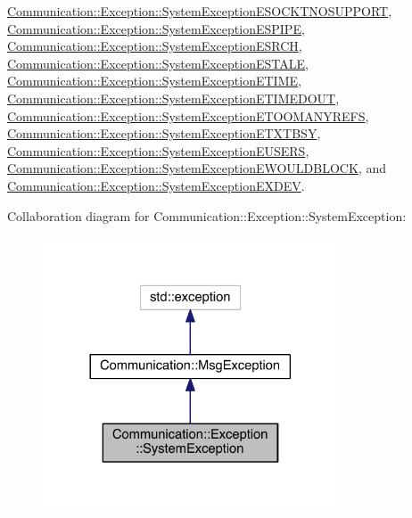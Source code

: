\hyperlink{class_communication_1_1_exception_1_1_system_exception_e_s_o_c_k_t_n_o_s_u_p_p_o_r_t}{Communication\+::\+Exception\+::\+System\+Exception\+E\+S\+O\+C\+K\+T\+N\+O\+S\+U\+P\+P\+O\+R\+T}, \hyperlink{class_communication_1_1_exception_1_1_system_exception_e_s_p_i_p_e}{Communication\+::\+Exception\+::\+System\+Exception\+E\+S\+P\+I\+P\+E}, \hyperlink{class_communication_1_1_exception_1_1_system_exception_e_s_r_c_h}{Communication\+::\+Exception\+::\+System\+Exception\+E\+S\+R\+C\+H}, \hyperlink{class_communication_1_1_exception_1_1_system_exception_e_s_t_a_l_e}{Communication\+::\+Exception\+::\+System\+Exception\+E\+S\+T\+A\+L\+E}, \hyperlink{class_communication_1_1_exception_1_1_system_exception_e_t_i_m_e}{Communication\+::\+Exception\+::\+System\+Exception\+E\+T\+I\+M\+E}, \hyperlink{class_communication_1_1_exception_1_1_system_exception_e_t_i_m_e_d_o_u_t}{Communication\+::\+Exception\+::\+System\+Exception\+E\+T\+I\+M\+E\+D\+O\+U\+T}, \hyperlink{class_communication_1_1_exception_1_1_system_exception_e_t_o_o_m_a_n_y_r_e_f_s}{Communication\+::\+Exception\+::\+System\+Exception\+E\+T\+O\+O\+M\+A\+N\+Y\+R\+E\+F\+S}, \hyperlink{class_communication_1_1_exception_1_1_system_exception_e_t_x_t_b_s_y}{Communication\+::\+Exception\+::\+System\+Exception\+E\+T\+X\+T\+B\+S\+Y}, \hyperlink{class_communication_1_1_exception_1_1_system_exception_e_u_s_e_r_s}{Communication\+::\+Exception\+::\+System\+Exception\+E\+U\+S\+E\+R\+S}, \hyperlink{class_communication_1_1_exception_1_1_system_exception_e_w_o_u_l_d_b_l_o_c_k}{Communication\+::\+Exception\+::\+System\+Exception\+E\+W\+O\+U\+L\+D\+B\+L\+O\+C\+K}, and \hyperlink{class_communication_1_1_exception_1_1_system_exception_e_x_d_e_v}{Communication\+::\+Exception\+::\+System\+Exception\+E\+X\+D\+E\+V}.



Collaboration diagram for Communication\+:\+:Exception\+:\+:System\+Exception\+:\nopagebreak
\begin{figure}[H]
\begin{center}
\leavevmode
\includegraphics[width=248pt]{class_communication_1_1_exception_1_1_system_exception__coll__graph}
\end{center}
\end{figure}
